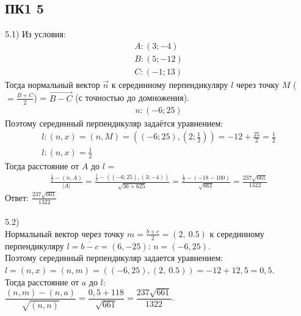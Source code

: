 		\subsection{ПК1 5}
		5.1)
		Из условия:
		\begin{gather*}
		A: (3;-4) \\
		B: (5;-12) \\
		C: (-1;13) 
		\end{gather*}
		Тогда нормальный вектор $\overrightarrow{n}$ к серединному перпендикуляру $l$ через точку $M$ ($= \frac{B+C}{2}$) = $\overrightarrow{B - C}$ (с точностью до домножения).
		\begin{gather*}
		n: (-6;25) 
		\end{gather*}
		Поэтому серединный перпендикуляр задаётся уравнением:
		\begin{gather*}
		l: (n, x) = (n, M) = ((-6;25), (2;\frac{1}{2})) = -12 + \frac{25}{2} = \frac{1}{2} \\
		l: (n, x) = \frac{1}{2} 
		\end{gather*}
		Тогда расстояние от $A$ до $l$ =
		\begin{gather*}
		\frac{\frac{1}{2} - (n, A)}{|A|} = \frac{\frac{1}{2} - ((-6;25), (3;-4))}{\sqrt{36+625}} = \frac{\frac{1}{2} - (-18 - 100)}{\sqrt{661}} = \frac{237\sqrt{661}}{1322}
		\end{gather*}
		Ответ: $\frac{237\sqrt{661}}{1322}$					
		\\ \\
		5.2)\\
		Нормальный вектор через точку $m = \frac{b + c}{2} = (2, \: 0.5)$ к серединному перпендикуляру $l = \overline{b - c} = (6, -25)$: $n = (-6, 25)$. \\
		Поэтому серединный перпендикуляр задается уравнением: \\
		$l = (n, x) = (n, m) = ((-6, 25), (2, \: 0.5)) = -12 + 12,5 = 0,5$. \\
		Тогда расстояние от $a$ до $l$: \\
		$\dfrac{(n, m) - (n, a)}{\sqrt{(n, n)}} = \dfrac{0,5 + 118}{\sqrt{661}} = \dfrac{237 \sqrt{661}}{1322}$.
		
		\newpage
